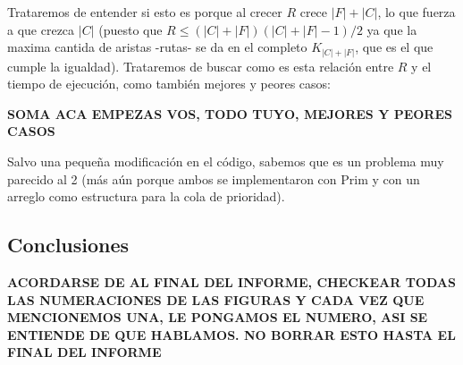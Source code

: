 \documentclass[A4paper,oneside,fleqn,11pt]{article}
\theoremstyle{definition}
\begin{document}
 Trataremos de entender si esto es porque al crecer $R$ crece $|F|+|C|$, lo que fuerza a que crezca $|C|$ (puesto que $R \leq (|C|+|F|)(|C|+|F|-1)/2$ ya que la maxima cantida de aristas -rutas- se da en el completo $K_{|C|+|F|}$, que es el que cumple la igualdad). Trataremos de buscar como es esta relación entre $R$ y el tiempo de ejecución, como también mejores y peores casos:



\textbf{SOMA ACA EMPEZAS VOS, TODO TUYO, MEJORES Y PEORES CASOS}



Salvo una pequeña modificación en el código, sabemos que es un problema muy parecido al 2 (más aún porque ambos se implementaron con Prim y con un arreglo como estructura para la cola de prioridad). 

\subsection{Conclusiones}


\textbf{ACORDARSE DE AL FINAL DEL INFORME, CHECKEAR TODAS LAS NUMERACIONES DE LAS FIGURAS Y CADA VEZ QUE MENCIONEMOS UNA, LE PONGAMOS EL NUMERO, ASI SE ENTIENDE DE QUE HABLAMOS. NO BORRAR ESTO HASTA EL FINAL DEL INFORME}
\end{document}
